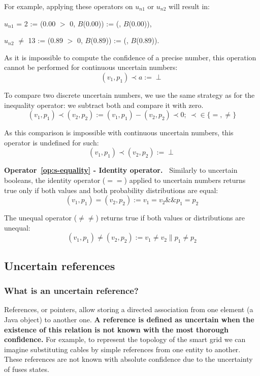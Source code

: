 For example, applying these operators on $u_{n1}$ or $u_{n2}$ will result in:
\begin{itemize*}
	\item[] $u_{n1}$ = 2 := (0.00 $>$ 0, $B$(0.00)) := (\false{}, $B$(0.00)),
	\item[] $u_{n2}$ $\ne$ 13 :=  (0.89 $>$ 0, $B$(0.89)) := (\true{}, $B$(0.89)).
\end{itemize*}

As it is impossible to compute the confidence of a precise number, this operation cannot be performed for continuous uncertain numbers:
$$(v_1, p_1) \prec a := \perp$$

To compare two discrete uncertain numbers, we use the same strategy as for the inequality operator: we subtract both and compare it with zero.
$$(v_1,p_1) \prec (v_2,p_2) := (v_1,p_1) - (v_2,p_2) \prec 0;~\prec \in \{=, \ne\}$$

As this comparison is impossible with continuous uncertain numbers, this operator is undefined for such:
$$(v_1,p_1) \prec (v_2,p_2) := \perp$$

\noindent\textbf{Operator~\ref{op:s-equality} - Identity operator.~}
Similarly to uncertain booleans, the identity operator ($==$) applied to uncertain numbers returns true only if both values and both probability distributions are equal:
$$(v_1,p_1) = (v_2,p_2) := v_1 = v_2 \&\& p_1 = p_2$$

The unequal operator ($\ne\ne$) returns true if both values or distributions are unequal:
$$(v_1,p_1) \ne (v_2,p_2) := v_1 \ne v_2 \| p_{1} \ne p_{2}$$

\subsection{Uncertain references}
\subsubsection{What is an uncertain reference?}
References, or pointers, allow storing a directed association from one element (\eg a Java object) to another one.
\textbf{A reference is defined as uncertain when the existence of this relation is not known with the most thorough confidence.}
For example, to represent the topology of the smart grid we can imagine substituting cables by simple references from one entity to another.
These references are not known with absolute confidence due to the uncertainty of fuses states.

